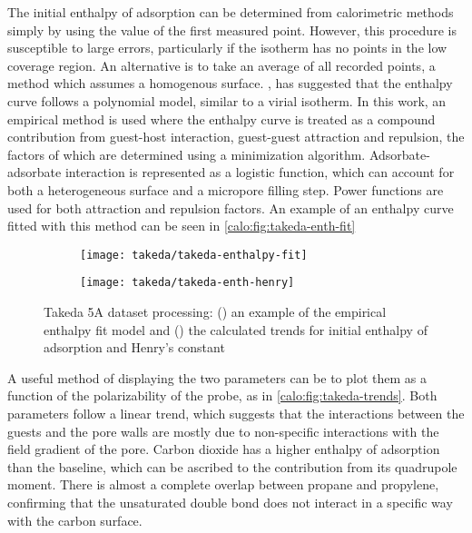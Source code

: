 The initial enthalpy of adsorption can be determined from calorimetric 
methods simply by using the value of the first measured point.
However, this procedure is susceptible to large errors, particularly
if the isotherm has no points in the low coverage region. An alternative
is to take an average of all recorded points, a method which assumes
a homogenous surface. \citet{myersThermodynamicsAdsorptionPorous2002},
has suggested that the enthalpy curve follows a polynomial model, similar
to a virial isotherm.
In this work, an empirical method is used where the enthalpy curve
is treated as a compound contribution from guest-host interaction,
guest-guest attraction and repulsion, the factors of which are determined
using a minimization algorithm. Adsorbate-adsorbate interaction is 
represented as a logistic function, which can account for both 
a heterogeneous surface and a micropore filling step. Power functions
are used for both attraction and repulsion factors. An example of 
an enthalpy curve fitted with this method can be seen 
in \autoref{calo:fig:takeda-enth-fit}

\begin{figure}[ht]

	\centering
	\begin{subfigure}[b]{.5\textwidth}
		\centering
		\texttt{[image: takeda/takeda-enthalpy-fit]}
		\caption{}%
		\label{calo:fig:takeda-enth-fit}
	\end{subfigure}%
	\begin{subfigure}[b]{.5\textwidth}
		\centering
		\texttt{[image: takeda/takeda-enth-henry]}
		\caption{}%
		\label{calo:fig:takeda-trends}
	\end{subfigure}
	\caption{Takeda 5A dataset processing: (\protect{})
	 an example of the empirical enthalpy fit model and (\protect{}) the calculated
		trends for initial enthalpy of adsorption and Henry's constant}%
	\label{calo:fig:takeda-analysis}

\end{figure}

A useful method of displaying the two parameters can be to plot them
as a function of the polarizability of the probe, as in
\autoref{calo:fig:takeda-trends}. Both parameters follow a linear
trend, which suggests that the interactions between the guests and the
pore walls are mostly due to non-specific interactions with the field
gradient of the pore. Carbon dioxide has a higher enthalpy
of adsorption than the baseline, which can be ascribed to the contribution 
from its quadrupole moment. There is almost a complete overlap between 
propane and propylene, confirming that the unsaturated double bond does not
interact in a specific way with the carbon surface.


